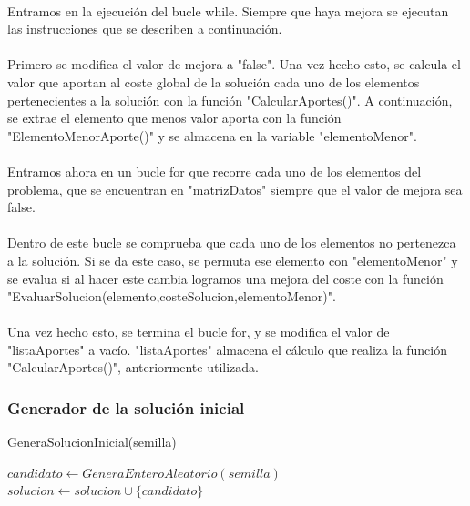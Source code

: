 \documentclass{article}
\begin{document}
	\paragraph{}Entramos en la ejecución del bucle while. Siempre que haya mejora se ejecutan las instrucciones que se describen a continuación.
	
	\paragraph{}Primero se modifica el valor de mejora a "false". Una vez hecho esto, se calcula el valor que aportan al coste global de la solución cada uno de los elementos pertenecientes a la solución con la función "CalcularAportes()". A continuación, se extrae el elemento que menos valor aporta con la función "ElementoMenorAporte()" y se almacena en la variable "elementoMenor".
	
	\paragraph{}Entramos ahora en un bucle for que recorre cada uno de los elementos del problema, que se encuentran en "matrizDatos" siempre que el valor de mejora sea false.
	
	\paragraph{}Dentro de este bucle se comprueba que cada uno de los elementos no pertenezca a la solución. Si se da este caso, se permuta ese elemento con "elementoMenor" y se evalua si al hacer este cambia logramos una mejora del coste con la función "EvaluarSolucion(elemento,costeSolucion,elementoMenor)".
	
	\paragraph{}Una vez hecho esto, se termina el bucle for, y se modifica el valor de "listaAportes" a vacío. "listaAportes" almacena el cálculo que realiza la función "CalcularAportes()", anteriormente utilizada.
	
	\subsubsection{Generador de la solución inicial}
	\begin{algorithm}[H]
		\caption{GeneraSolucionInicial(semilla)}
		\begin{algorithmic}
			\STATE $candidato \leftarrow GeneraEnteroAleatorio(semilla)$
			\STATE $solucion \leftarrow solucion \cup \{candidato\}$
			\ENDIF
			\ENDWHILE
		\end{algorithmic}
	\end{algorithm}
	
\end{document}
